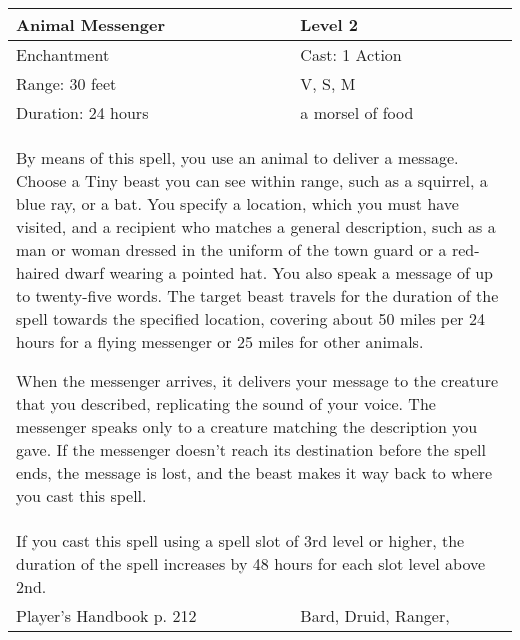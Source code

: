 \documentclass[11pt]{report}
\begin{document}
\begin{table}[H]
	\begin{tabular}{||p{6cm}|p{6cm}||}
		\hline\hline
		\bf{Animal Messenger} & Level 2\\ \hline
		Enchantment & Cast: 1 Action\\ \hline
		Range: 30 feet & V, S, M\\ \hline
		Duration: 24 hours & a morsel of food\\ \hline
		\multicolumn{2}{||p{12cm}||}{By means of this spell, you use an animal to deliver a message.
Choose a Tiny beast you can see within range, such as a squirrel, a blue ray, or a bat. You specify a location, which you must have visited, and a recipient who matches a general description, such as a man or woman dressed in the uniform of the town guard or a red-haired dwarf wearing a pointed hat. You also speak a message of up to twenty-five words. The target beast travels for the duration of the spell towards the specified location, covering about 50 miles per 24 hours for a flying messenger or 25 miles for other animals.

When the messenger arrives, it delivers your message to the creature that you described, replicating the sound of your voice. The messenger speaks only to a creature matching the description you gave. If the messenger doesn’t reach its destination before the spell ends, the message is lost, and the beast makes it way back to where you cast this spell.}\\ \hline
		\multicolumn{2}{||p{12cm}||}{If you cast this spell using a spell slot of 3rd level or higher, the duration of the spell increases by 48 hours for each slot level above 2nd.}\\ \hline
Player's Handbook p. 212 & Bard, Druid, Ranger, \\ \hline\hline
	\end{tabular}
\end{table}
\end{document}
